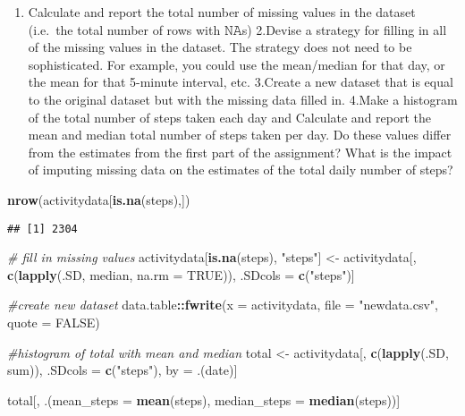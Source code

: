 \documentclass[
]{article}
\newenvironment{Shaded}{\begin{snugshade}}{\end{snugshade}}
\newcommand{\CommentTok}[1]{\textcolor[rgb]{0.56,0.35,0.01}{\textit{#1}}}
\newcommand{\DataTypeTok}[1]{\textcolor[rgb]{0.13,0.29,0.53}{#1}}
\newcommand{\KeywordTok}[1]{\textcolor[rgb]{0.13,0.29,0.53}{\textbf{#1}}}
\newcommand{\NormalTok}[1]{#1}
\newcommand{\OperatorTok}[1]{\textcolor[rgb]{0.81,0.36,0.00}{\textbf{#1}}}
\newcommand{\OtherTok}[1]{\textcolor[rgb]{0.56,0.35,0.01}{#1}}
\newcommand{\StringTok}[1]{\textcolor[rgb]{0.31,0.60,0.02}{#1}}
\providecommand{\tightlist}{%
  \setlength{\itemsep}{0pt}\setlength{\parskip}{0pt}}
\begin{document}
\begin{enumerate}
\def\labelenumi{\arabic{enumi}.}
\tightlist
\item
  Calculate and report the total number of missing values in the dataset
  (i.e.~the total number of rows with 𝙽𝙰s) 2.Devise a strategy for
  filling in all of the missing values in the dataset. The strategy does
  not need to be sophisticated. For example, you could use the
  mean/median for that day, or the mean for that 5-minute interval, etc.
  3.Create a new dataset that is equal to the original dataset but with
  the missing data filled in. 4.Make a histogram of the total number of
  steps taken each day and Calculate and report the mean and median
  total number of steps taken per day. Do these values differ from the
  estimates from the first part of the assignment? What is the impact of
  imputing missing data on the estimates of the total daily number of
  steps?
\end{enumerate}

\begin{Shaded}
\begin{Highlighting}[]
\KeywordTok{nrow}\NormalTok{(activitydata[}\KeywordTok{is.na}\NormalTok{(steps),])}
\end{Highlighting}
\end{Shaded}

\begin{verbatim}
## [1] 2304
\end{verbatim}

\begin{Shaded}
\begin{Highlighting}[]
\CommentTok{# fill in missing values}
\NormalTok{activitydata[}\KeywordTok{is.na}\NormalTok{(steps), }\StringTok{"steps"}\NormalTok{] <-}\StringTok{ }\NormalTok{activitydata[, }\KeywordTok{c}\NormalTok{(}\KeywordTok{lapply}\NormalTok{(.SD, median, }\DataTypeTok{na.rm =} \OtherTok{TRUE}\NormalTok{)), .SDcols =}\StringTok{ }\KeywordTok{c}\NormalTok{(}\StringTok{"steps"}\NormalTok{)]}

\CommentTok{#create new dataset}
\NormalTok{data.table}\OperatorTok{::}\KeywordTok{fwrite}\NormalTok{(}\DataTypeTok{x =}\NormalTok{ activitydata, }\DataTypeTok{file =} \StringTok{"newdata.csv"}\NormalTok{, }\DataTypeTok{quote =} \OtherTok{FALSE}\NormalTok{)}

\CommentTok{#histogram of total with mean and median}
\NormalTok{total <-}\StringTok{ }\NormalTok{activitydata[, }\KeywordTok{c}\NormalTok{(}\KeywordTok{lapply}\NormalTok{(.SD, sum)), .SDcols =}\StringTok{ }\KeywordTok{c}\NormalTok{(}\StringTok{"steps"}\NormalTok{), by =}\StringTok{ }\NormalTok{.(date)]}

\NormalTok{total[, .(}\DataTypeTok{mean_steps =} \KeywordTok{mean}\NormalTok{(steps), }\DataTypeTok{median_steps =} \KeywordTok{median}\NormalTok{(steps))]}
\end{Highlighting}
\end{Shaded}
\end{document}
